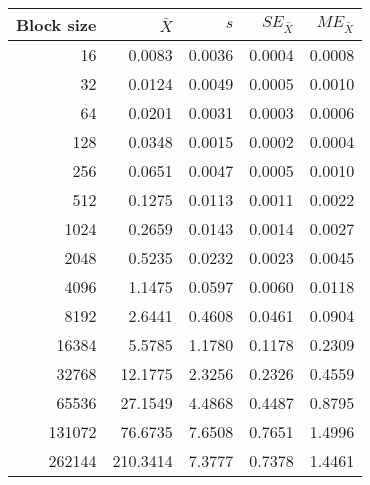 \begin{tabular}{rrrrr}\toprule
{\small Block size} & $\bar{X}$ & $s$ & $SE_{\bar{X}}$ & $ME_{\bar{X}}$ \\\midrule
16 & 0.0083 & 0.0036 & 0.0004 & 0.0008\\
32 & 0.0124 & 0.0049 & 0.0005 & 0.0010\\
64 & 0.0201 & 0.0031 & 0.0003 & 0.0006\\
128 & 0.0348 & 0.0015 & 0.0002 & 0.0004\\
256 & 0.0651 & 0.0047 & 0.0005 & 0.0010\\
512 & 0.1275 & 0.0113 & 0.0011 & 0.0022\\
1024 & 0.2659 & 0.0143 & 0.0014 & 0.0027\\
2048 & 0.5235 & 0.0232 & 0.0023 & 0.0045\\
4096 & 1.1475 & 0.0597 & 0.0060 & 0.0118\\
8192 & 2.6441 & 0.4608 & 0.0461 & 0.0904\\
16384 & 5.5785 & 1.1780 & 0.1178 & 0.2309\\
32768 & 12.1775 & 2.3256 & 0.2326 & 0.4559\\
65536 & 27.1549 & 4.4868 & 0.4487 & 0.8795\\
131072 & 76.6735 & 7.6508 & 0.7651 & 1.4996\\
262144 & 210.3414 & 7.3777 & 0.7378 & 1.4461\\
\bottomrule
\end{tabular}
